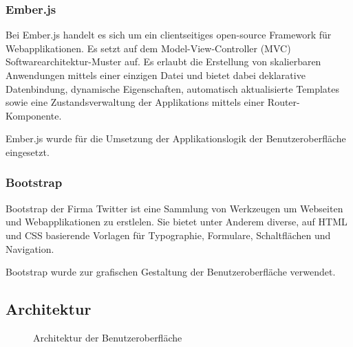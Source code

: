 \subsubsection{Ember.js}
\label{ssubsec:komponenten:gui:komponenten:emberjs}
Bei Ember.js handelt es sich um ein clientseitiges open-source Framework für Webapplikationen. Es setzt auf dem Model-View-Controller (MVC) Softwarearchitektur-Muster auf. Es erlaubt die Erstellung von skalierbaren Anwendungen mittels einer einzigen Datei und bietet dabei deklarative Datenbindung, dynamische Eigenschaften, automatisch aktualisierte Templates sowie eine Zustandsverwaltung der Applikations mittels einer Router-Komponente.~\cite{ember}

Ember.js wurde für die Umsetzung der Applikationslogik der Benutzeroberfläche eingesetzt.

\subsubsection{Bootstrap}
\label{ssubsec:komponenten:gui:komponenten:bootstrap}
Bootstrap der Firma Twitter ist eine Sammlung von Werkzeugen um Webseiten und Webapplikationen zu erstlelen. Sie bietet unter Anderem diverse, auf HTML und CSS basierende Vorlagen für Typographie, Formulare, Schaltflächen und Navigation.~\cite{bootstrap}

Bootstrap wurde zur grafischen Gestaltung der Benutzeroberfläche verwendet.

\subsection{Architektur}
\label{subsec:komponenten:gui:architektur}
\begin{figure}[H]
    \centering {}
    \caption{Architektur der Benutzeroberfläche\label{fig:architektur:gui}\protect\footnotemark}
\end{figure}

